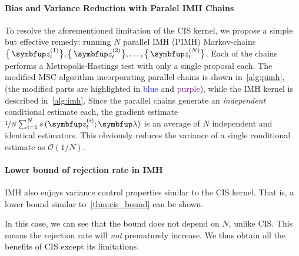 \vspace{-0.02in}

\vspace{-0.01in}

\vspace{-0.1in}
\paragraph{Bias and Variance Reduction with Paralel IMH Chains}
To resolve the aforementioned limitation of the CIS kernel, we propose a simple but effective remedy: running \(N\) parallel IMH (PIMH) Markov-chains \( \big\{\,\vz_t^{(1)}\big\}, \big\{\,\vz_t^{(2)}\big\}, \ldots, \big\{\,\vz_t^{(N)}\big\}\).
Each of the chains performs a Metropolis-Hastings test with only a single proposal each.
The modified MSC algorithm incorporating parallel chains is shown in~\cref{alg:pimh}, (the modified parts are highlighted in \textcolor{blue}{blue} and \textcolor{purple}{purple}), while the IMH kernel is described in~\cref{alg:imh}.
Since the parallel chains generate an \textit{independent} conditional estimate each, the gradient estimate \(\nicefrac{1}{N} \sum^{N}_{i=1} s\,(\vz_t^{(i)}; \vlambda)\) is an average of \(N\) independent and identical estimators.
This obviously reduces the variance of a single conditional estimate as \(\mathcal{O}(1/N)\).
%
%

\vspace{-0.1in}
\paragraph{Lower bound of rejection rate in IMH}
IMH also enjoys variance control properties similar to the CIS kernel.
That is, a lower bound similar to~\cref{thm:cis_bound} can be shown.
%

%
In this case, we can see that the bound does not depend on \(N\), unlike CIS.
This means the rejection rate will \textit{not} prematurely increase.
We thus obtain all the benefits of CIS except its limitations.

\vspace{-0.1in}
